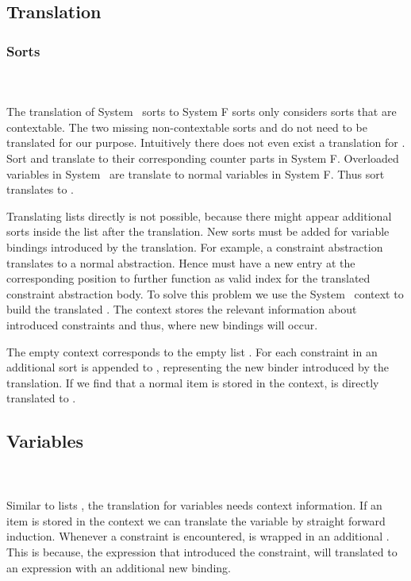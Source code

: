 \subsection{Translation}
\subsubsection{Sorts}\hfill\\\\
The translation of System \Fo\ sorts to System F sorts only considers sorts that are contextable. The two missing non-contextable sorts  and  do not need to be translated for our purpose. Intuitively there does not even exist a translation for .
\DPTSort
Sort  and  translate to their corresponding counter parts in System F. Overloaded variables in System \Fo\ are translate to normal variables in System F. Thus sort  translates to . 

\noindent Translating lists  directly is not possible, because there might appear additional sorts inside the list after the translation. 
New sorts must be added for variable bindings introduced by the translation. 
For example, a constraint abstraction translates to a normal abstraction. 
Hence  must have a new entry  at the corresponding position to further function as valid index for the translated constraint abstraction body. 
To solve this problem we use the System \Fo\ context  to build the translated . 
The context stores the relevant information about introduced constraints and thus, where new bindings will occur. 

\DPTSorts
The empty context  corresponds to the empty list \Constr{[]}.
For each constraint in  an additional sort  is appended to , representing the new binder introduced by the translation. If we find that a normal item is stored in the context,  is directly translated to  .

\subsection{Variables}\hfill\\\\
Similar to lists , the translation for variables  needs context information.  
\DPTVar
If an item is stored in the context we can translate the variable by straight forward induction. 
Whenever a constraint is encountered,  is wrapped in an additional . This is because, the expression that introduced the constraint, will translated to an expression with an additional new binding.


